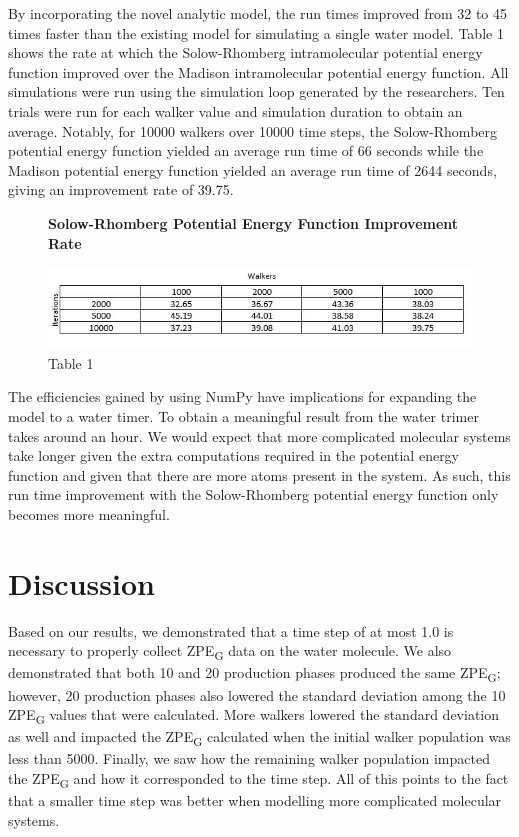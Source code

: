 \documentclass[journal=jacsat,manuscript=article]{achemso}
\newcommand*{\figuretitle}[1]{%
    {\centering%
    \textbf{#1}%
    \par\medskip}%
}
\begin{document}
By incorporating the novel analytic model, the run times improved from 32 to 45 times faster than the existing model for simulating a single water model. Table 1 shows the rate at which the Solow-Rhomberg intramolecular potential energy function improved over the Madison intramolecular potential energy function. All simulations were run using the simulation loop generated by the researchers. Ten trials were run for each walker value and simulation duration to obtain an average. Notably, for 10000 walkers over 10000 time steps, the Solow-Rhomberg potential energy function yielded an average run time of 66 seconds while the Madison potential energy function yielded an average run time of 2644 seconds, giving an improvement rate of 39.75.

\begin{figure}[H]
\centering
\figuretitle{Solow-Rhomberg Potential Energy Function Improvement Rate}
\includegraphics[width=\linewidth]{figures/Table_1.jpg}
\caption{Table 1}
\end{figure}

The efficiencies gained by using NumPy have implications for expanding the model to a water timer. To obtain a meaningful result from the water trimer takes around an hour. We would expect that more complicated molecular systems take longer given the extra computations required in the potential energy function and given that there are more atoms present in the system. As such, this run time improvement with the Solow-Rhomberg potential energy function only becomes more meaningful.

\section{Discussion}

Based on our results, we demonstrated that a time step of at most 1.0 is necessary to properly collect ZPE\textsubscript{G} data on the water molecule. We also demonstrated that both 10 and 20 production phases produced the same ZPE\textsubscript{G}; however, 20 production phases also lowered the standard deviation among the 10 ZPE\textsubscript{G} values that were calculated. More walkers lowered the standard deviation as well and impacted the ZPE\textsubscript{G} calculated when the initial walker population was less than 5000. Finally, we saw how the remaining walker population impacted the ZPE\textsubscript{G} and how it corresponded to the time step. All of this points to the fact that a smaller time step was better when modelling more complicated molecular systems. 
\end{document}
